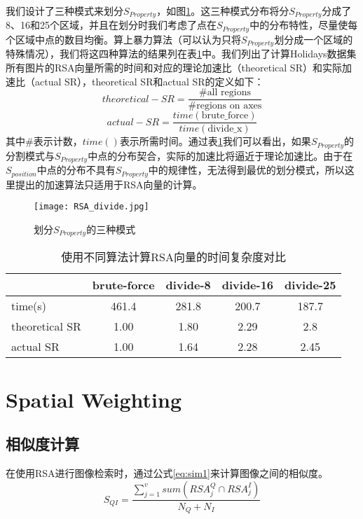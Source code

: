 我们设计了三种模式来划分$S_{Property}$，如图\ref{fig:RSA_d}。这三种模式分布将分$S_{Property}$分成了8、16和25个区域，并且在划分时我们考虑了点在$S_{Property}$中的分布特性，尽量使每个区域中点的数目均衡。算上暴力算法（可以认为只将$S_{Property}$划分成一个区域的特殊情况），我们将这四种算法的结果列在表\ref{tab:divide}中。我们列出了计算Holidays数据集所有图片的RSA向量所需的时间和对应的理论加速比（theoretical SR）和实际加速比（actual SR），theoretical  SR和actual SR的定义如下：
\begin{equation}
theoretical-SR = \frac{\#\text{all regions}}{\#\text{regions on axes}}
\end{equation}
\begin{equation}
actual-SR = \frac{time(\text{brute\_force})}{time(\text{divide\_x})}
\end{equation}
其中$\#$表示计数，$time()$表示所需时间。通过表\ref{tab:divide}我们可以看出，如果$S_{Property}$的分割模式与$S_{Property}$中点的分布契合，实际的加速比将逼近于理论加速比。由于在$S_{position}$中点的分布不具有$S_{Property}$中的规律性，无法得到最优的划分模式，所以这里提出的加速算法只适用于RSA向量的计算。

\begin{figure}[h]
	\centering
	\texttt{[image: RSA\_divide.jpg]}
	\caption{划分$S_{Property}$的三种模式}\label{fig:RSA_d}
\end{figure}

\begin{table}
	\begin{center}
		\begin{tabular}{|l|c|c|c|c|}
			\hline
			& brute-force & divide-8  & divide-16 & divide-25 \\
			\hline
			time(s)    		& 461.4       & 281.8     & 200.7     & 187.7 \\
			theoretical SR	& 1.00        & 1.80      & 2.29      & 2.8 \\
			actual SR		& 1.00        & 1.64      & 2.28      & 2.45 \\    
			\hline
		\end{tabular}
	\end{center}
	\caption{使用不同算法计算RSA向量的时间复杂度对比}
	\label{tab:divide}
\end{table}

\section{Spatial Weighting}
\subsection{相似度计算}
在使用RSA进行图像检索时，通过公式\ref{eq:sim1}来计算图像之间的相似度。
\begin{equation}\label{eq:sim1}
S_{QI} = \frac{\sum_{j=1}^vsum(RSA_j^Q \cap RSA_j^I)}{N_Q + N_I}
\end{equation}

